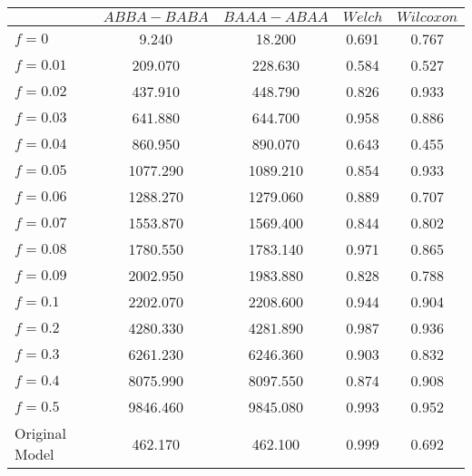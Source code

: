 \begin{tabular}{lcccc}
\toprule
 & $ABBA-BABA$ & $BAAA-ABAA$ & $Welch$ & $Wilcoxon$ \\
\midrule
$f = 0$ & 9.240 & 18.200 & 0.691 & 0.767 \\
$f = 0.01$ & 209.070 & 228.630 & 0.584 & 0.527 \\
$f = 0.02$ & 437.910 & 448.790 & 0.826 & 0.933 \\
$f = 0.03$ & 641.880 & 644.700 & 0.958 & 0.886 \\
$f = 0.04$ & 860.950 & 890.070 & 0.643 & 0.455 \\
$f = 0.05$ & 1077.290 & 1089.210 & 0.854 & 0.933 \\
$f = 0.06$ & 1288.270 & 1279.060 & 0.889 & 0.707 \\
$f = 0.07$ & 1553.870 & 1569.400 & 0.844 & 0.802 \\
$f = 0.08$ & 1780.550 & 1783.140 & 0.971 & 0.865 \\
$f = 0.09$ & 2002.950 & 1983.880 & 0.828 & 0.788 \\
$f = 0.1$ & 2202.070 & 2208.600 & 0.944 & 0.904 \\
$f = 0.2$ & 4280.330 & 4281.890 & 0.987 & 0.936 \\
$f = 0.3$ & 6261.230 & 6246.360 & 0.903 & 0.832 \\
$f = 0.4$ & 8075.990 & 8097.550 & 0.874 & 0.908 \\
$f = 0.5$ & 9846.460 & 9845.080 & 0.993 & 0.952 \\
Original Model & 462.170 & 462.100 & 0.999 & 0.692 \\
\bottomrule
\end{tabular}
